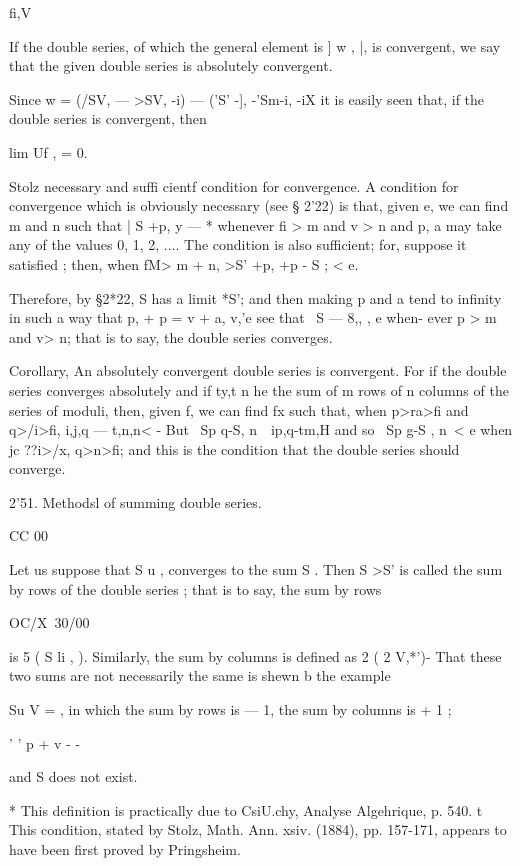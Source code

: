  fi,V



If the double series, of which the general element is ] w , |, is
convergent, we say that the given double series is absolutely
convergent.

Since w = (/SV, — >SV, -i) — ('S' -], -'Sm-i, -iX it is easily seen
that, if the double series is convergent, then

lim Uf , = 0.

Stolz necessary and suffi cientf condition for convergence. A
condition for convergence which is obviously necessary (see § 2'22) is
that, given e, we can find m and n such that | S +p, y — *%
whenever fi > m and v > n and p, a may take any of the values 0, 1, 2,
.... The condition is also sufficient; for, suppose it satisfied ;
then, when fM> m + n, >S' +p, +p - S ; < e.

Therefore, by §2*22, S has a limit *S'; and then making p and a tend
to infinity in such a way that p, + p = v + a, v,'e see that \ S — 8,,
, e when- ever p > m and v> n; that is to say, the double series
converges.

Corollary, An absolutely convergent double series is convergent. For
if the double series converges absolutely and if ty,t n he the sum of
m rows of n columns of the series of moduli, then, given f, we can
find fx such that, when p>ra>fi and q>/i>fi, i,j,q — t,n,n< - But \ Sp
q-S, n\ \ ip,q-tm,H and so \ Sp g-S , n\ < e when jc ??i>/x, q>n>fi;
and this is the condition that the double series should converge.

2'51. Methodsl of summing double series.

CC 00

Let us suppose that S u , converges to the sum S . Then S >S' is
called the sum by rows of the double series ; that is to say, the sum
by rows

OC/X\ 30/00\

is 5 ( S li , ). Similarly, the sum by columns is defined as 2 ( 2
V,*')- That these two sums are not necessarily the same is shewn b the
example

Su V = , in which the sum by rows is — 1, the sum by columns is + 1 ;

' ' p + v - -

and S does not exist.

* This definition is practically due to CsiU.chy, Analyse Algehrique,
p. 540. t This condition, stated by Stolz, Math. Ann. xsiv. (1884),
pp. 157-171, appears to have been first proved by Pringsheim.

